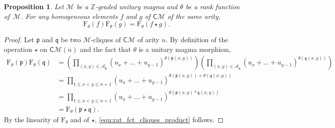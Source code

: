 \documentclass[10pt,reqno]{amsart}
\numberwithin{equation}{subsection}
\renewcommand{\leq}{\leqslant}
\newtheorem{Proposition}[Theorem]{Proposition}
\newcommand{\Z}{\mathbb{Z}}
\newcommand{\Mca}{\mathcal{M}}
\newcommand{\Pfr}{\mathfrak{p}}
\newcommand{\Qfr}{\mathfrak{q}}
\newcommand{\Cli}{\mathsf{C}}
\newcommand{\Op}{\star}
\newcommand{\Arcs}{\mathcal{A}}
\newcommand{\Frac}{\mathrm{F}}
\begin{document}
\begin{Proposition} \label{prop:rat_fct_cliques_product}
    Let $\Mca$ be a $\Z$-graded unitary magma and $\theta$ be a rank
    function of~$\Mca$. For any homogeneous elements $f$ and $g$ of
    $\Cli\Mca$ of the same arity,
    \begin{equation} \label{equ:rat_fct_cliques_product}
        \Frac_\theta(f) \Frac_\theta(g) = \Frac_\theta(f \Op g).
    \end{equation}
\end{Proposition}
\begin{proof}
    Let $\Pfr$ and $\Qfr$ be two $\Mca$-cliques of $\Cli\Mca$ of arity
    $n$. By definition of the operation $\Op$ on $\Cli\Mca(n)$ and the
    fact that $\theta$ is a unitary magma morphism,
    \begin{equation}\begin{split}
        \Frac_\theta(\Pfr) \Frac_\theta(\Qfr)
        & =
        \left(
        \prod_{(x, y) \in \Arcs_\Pfr}
        \left(u_x + \dots + u_{y - 1}\right)^{\theta(\Pfr(x, y))}
        \right)
        \left(
        \prod_{(x, y) \in \Arcs_\Qfr}
        \left(u_x + \dots + u_{y - 1}\right)^{\theta(\Qfr(x, y))}
        \right) \\
        & =
        \prod_{1 \leq x < y \leq n + 1}
        \left(u_x + \dots + u_{y - 1}\right)
            ^{\theta(\Pfr(x, y)) + \theta(\Qfr(x, y))} \\
        & =
        \prod_{1 \leq x < y \leq n + 1}
        \left(u_x + \dots + u_{y - 1}\right)
            ^{\theta(\Pfr(x, y) * \Qfr(x, y))} \\
        & = \Frac_\theta(\Pfr \Op \Qfr).
    \end{split}\end{equation}
    By the linearity of $\Frac_\theta$ and of $\Op$,
    \eqref{equ:rat_fct_cliques_product} follows.
\end{proof}
\medskip
\end{document}
